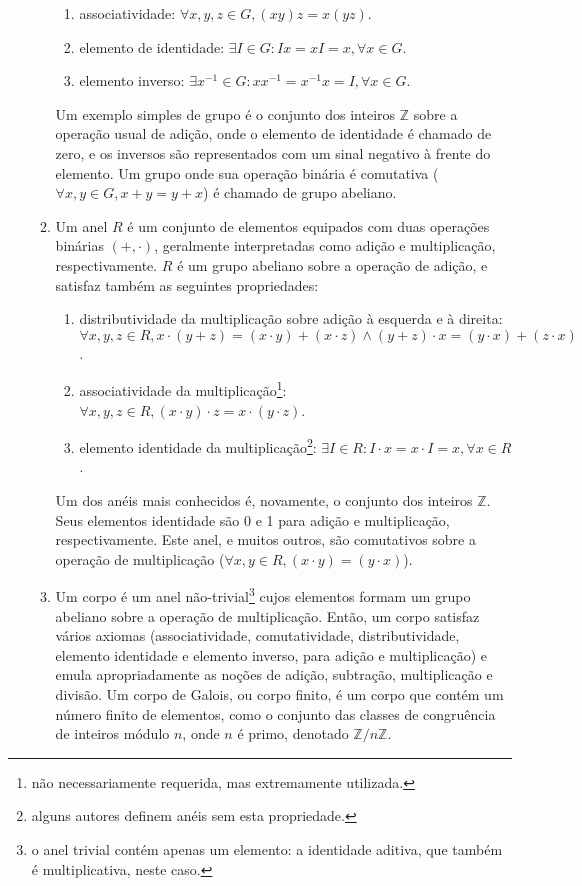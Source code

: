 \documentclass[fleqn]{../sftex/sftex}
\begin{document}
\begin{enumerate}[label= (\textbf{\arabic*})]
\begin{enumerate}
\begin{enumerate}
\item associatividade: $\forall x, y, z \in G, (x y) z = x (y z)$.
\item elemento de identidade: $\exists I \in G : Ix = xI = x,
\forall x \in G$.
\item elemento inverso: $\exists x^{-1} \in G : x x^{-1} = x^{-1} x = I,
\forall x \in G$.

\end{enumerate}

Um exemplo simples de grupo é o conjunto dos inteiros $\mathbb{Z}$ sobre a
operação usual de adição, onde o elemento de identidade é chamado de zero, e
os inversos são representados com um sinal negativo à frente do elemento. Um
grupo onde sua operação binária é comutativa
($\forall x, y \in G, x + y = y + x$) é chamado de grupo abeliano.

\item Um anel $R$ é um conjunto de elementos equipados com duas operações
binárias $(+, \cdot)$, geralmente interpretadas como adição e multiplicação,
respectivamente. $R$ é um grupo abeliano sobre a operação de adição, e
satisfaz também as seguintes propriedades:

\begin{enumerate}

\item distributividade da multiplicação sobre adição à esquerda e à direita:
$\forall x, y, z \in R, x \cdot (y + z) = (x \cdot y) + (x \cdot z)
\land (y + z) \cdot x = (y \cdot x) + (z \cdot x)$.
\item associatividade da multiplicação\footnote{não necessariamente requerida,
mas extremamente utilizada.}: $\forall x, y, z \in R, (x \cdot y) \cdot z
= x \cdot (y \cdot z)$.
\item elemento identidade da multiplicação\footnote{alguns autores definem
anéis sem esta propriedade.}: $\exists I \in R : I \cdot x = x \cdot I = x,
\forall x \in R$.

\end{enumerate}

Um dos anéis mais conhecidos é, novamente, o conjunto dos inteiros
$\mathbb{Z}$. Seus elementos identidade são 0 e 1 para adição e multiplicação,
respectivamente. Este anel, e muitos outros, são comutativos sobre a operação
de multiplicação ($\forall x, y \in R, (x \cdot y) = (y \cdot x)$).

\item Um corpo é um anel não-trivial\footnote{o anel trivial contém apenas um
elemento: a identidade aditiva, que também é multiplicativa, neste caso.}
cujos elementos formam um grupo abeliano sobre a operação de multiplicação.
Então, um corpo satisfaz vários axiomas (associatividade, comutatividade,
distributividade, elemento identidade e elemento inverso, para adição e
multiplicação) e emula apropriadamente as noções de adição, subtração,
multiplicação e divisão. Um corpo de Galois, ou corpo finito, é um corpo que
contém um número finito de elementos, como o conjunto das classes de
congruência de inteiros módulo $n$, onde $n$ é primo, denotado
$\mathbb{Z}/n\mathbb{Z}$.


\end{enumerate}
\end{enumerate}
\end{document}
